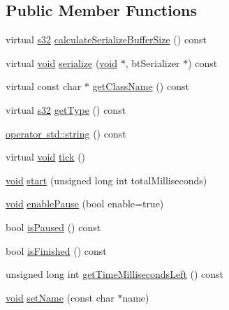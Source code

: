 \subsection*{Public Member Functions}
\begin{DoxyCompactItemize}
\item 
virtual \mbox{\hyperlink{_util_8h_aa62c75d314a0d1f37f79c4b73b2292e2}{s32}} \mbox{\hyperlink{classnjli_1_1_timer_a329822765b1177b2cead8b24ef7b34e8}{calculate\+Serialize\+Buffer\+Size}} () const
\item 
virtual \mbox{\hyperlink{_thread_8h_af1e856da2e658414cb2456cb6f7ebc66}{void}} \mbox{\hyperlink{classnjli_1_1_timer_a12146561a9d2406251a2f6cda1833bb7}{serialize}} (\mbox{\hyperlink{_thread_8h_af1e856da2e658414cb2456cb6f7ebc66}{void}} $\ast$, bt\+Serializer $\ast$) const
\item 
virtual const char $\ast$ \mbox{\hyperlink{classnjli_1_1_timer_a6a6519d8ec6e61474342ee6ead61fa6d}{get\+Class\+Name}} () const
\item 
virtual \mbox{\hyperlink{_util_8h_aa62c75d314a0d1f37f79c4b73b2292e2}{s32}} \mbox{\hyperlink{classnjli_1_1_timer_ad83006f62efbd2da2155e28ea15072f8}{get\+Type}} () const
\item 
\mbox{\hyperlink{classnjli_1_1_timer_ac9cead3fa2f8c9c15a18ef9684f0dbaf}{operator std\+::string}} () const
\item 
virtual \mbox{\hyperlink{_thread_8h_af1e856da2e658414cb2456cb6f7ebc66}{void}} \mbox{\hyperlink{classnjli_1_1_timer_a3ae16ee82dd08e6584913ffc4c55793a}{tick}} ()
\item 
\mbox{\hyperlink{_thread_8h_af1e856da2e658414cb2456cb6f7ebc66}{void}} \mbox{\hyperlink{classnjli_1_1_timer_a7b6b18b762f9037a0c45683f45961f5f}{start}} (unsigned long int total\+Milliseconds)
\item 
\mbox{\hyperlink{_thread_8h_af1e856da2e658414cb2456cb6f7ebc66}{void}} \mbox{\hyperlink{classnjli_1_1_timer_ab7f75a80b1152e200a086f09ce1817c4}{enable\+Pause}} (bool enable=true)
\item 
bool \mbox{\hyperlink{classnjli_1_1_timer_a7184d3e27ef45550fbc07bb2580bb075}{is\+Paused}} () const
\item 
bool \mbox{\hyperlink{classnjli_1_1_timer_a29750c69a007f00c7ecaf180b4fed52b}{is\+Finished}} () const
\item 
unsigned long int \mbox{\hyperlink{classnjli_1_1_timer_a84efdb170831202bb478521f3c65a55a}{get\+Time\+Milliseconds\+Left}} () const
\item 
\mbox{\hyperlink{_thread_8h_af1e856da2e658414cb2456cb6f7ebc66}{void}} \mbox{\hyperlink{classnjli_1_1_timer_a087eb5f8d9f51cc476f12f1d10a3cb95}{set\+Name}} (const char $\ast$name)

\end{DoxyCompactItemize}
